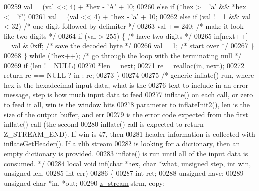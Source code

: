 \begin{DoxyCode}
{{{{{00259             val = (val << 4) + *hex - \textcolor{charliteral}{'A'} + 10;
00260         \textcolor{keywordflow}{else} \textcolor{keywordflow}{if} (*hex >= \textcolor{charliteral}{'a'} && *hex <= \textcolor{charliteral}{'f'})
00261             val = (val << 4) + *hex - \textcolor{charliteral}{'a'} + 10;
00262         \textcolor{keywordflow}{else} \textcolor{keywordflow}{if} (val != 1 && val < 32)  \textcolor{comment}{/* one digit followed by delimiter */}
00263             val += 240;                 \textcolor{comment}{/* make it look like two digits */}
00264         \textcolor{keywordflow}{if} (val > 255) \{                \textcolor{comment}{/* have two digits */}
00265             in[next++] = val & 0xff;    \textcolor{comment}{/* save the decoded byte */}
00266             val = 1;                    \textcolor{comment}{/* start over */}
00267         \}
00268     \} \textcolor{keywordflow}{while} (*hex++);       \textcolor{comment}{/* go through the loop with the terminating null */}
00269     \textcolor{keywordflow}{if} (len != NULL)
00270         *len = next;
00271     re = realloc(in, next);
00272     \textcolor{keywordflow}{return} re == NULL ? in : re;
00273 \}
00274 
00275 \textcolor{comment}{/* generic inflate() run, where hex is the hexadecimal input data, what is the}
00276 \textcolor{comment}{   text to include in an error message, step is how much input data to feed}
00277 \textcolor{comment}{   inflate() on each call, or zero to feed it all, win is the window bits}
00278 \textcolor{comment}{   parameter to inflateInit2(), len is the size of the output buffer, and err}
00279 \textcolor{comment}{   is the error code expected from the first inflate() call (the second}
00280 \textcolor{comment}{   inflate() call is expected to return Z\_STREAM\_END).  If win is 47, then}
00281 \textcolor{comment}{   header information is collected with inflateGetHeader().  If a zlib stream}
00282 \textcolor{comment}{   is looking for a dictionary, then an empty dictionary is provided.}
00283 \textcolor{comment}{   inflate() is run until all of the input data is consumed. */}
00284 local \textcolor{keywordtype}{void} inf(\textcolor{keywordtype}{char} *hex, \textcolor{keywordtype}{char} *what, \textcolor{keywordtype}{unsigned} step, \textcolor{keywordtype}{int} win, \textcolor{keywordtype}{unsigned} len,
00285                \textcolor{keywordtype}{int} err)
00286 \{
00287     \textcolor{keywordtype}{int} ret;
00288     \textcolor{keywordtype}{unsigned} have;
00289     \textcolor{keywordtype}{unsigned} \textcolor{keywordtype}{char} *in, *out;
00290     \hyperlink{structz__stream__s}{z\_stream} strm, copy;
}}}}}
\end{DoxyCode}
